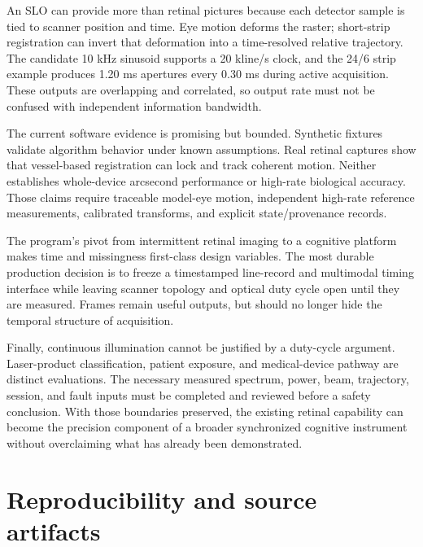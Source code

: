 \documentclass[11pt]{article}
\begin{document}
An SLO can provide more than retinal pictures because each detector sample is tied to scanner
position and time. Eye motion deforms the raster; short-strip registration can invert that
deformation into a time-resolved relative trajectory. The candidate 10 kHz sinusoid supports a
20 kline/s clock, and the 24/6 strip example produces 1.20 ms apertures every 0.30 ms during active
acquisition. These outputs are overlapping and correlated, so output rate must not be confused with
independent information bandwidth.

The current software evidence is promising but bounded. Synthetic fixtures validate algorithm
behavior under known assumptions. Real retinal captures show that vessel-based registration can
lock and track coherent motion. Neither establishes whole-device arcsecond performance or
high-rate biological accuracy. Those claims require traceable model-eye motion, independent
high-rate reference measurements, calibrated transforms, and explicit state/provenance records.

The program's pivot from intermittent retinal imaging to a cognitive platform makes time and
missingness first-class design variables. The most durable production decision is to freeze a
timestamped line-record and multimodal timing interface while leaving scanner topology and optical
duty cycle open until they are measured. Frames remain useful outputs, but should no longer hide
the temporal structure of acquisition.

Finally, continuous illumination cannot be justified by a duty-cycle argument. Laser-product
classification, patient exposure, and medical-device pathway are distinct evaluations. The
necessary measured spectrum, power, beam, trajectory, session, and fault inputs must be completed
and reviewed before a safety conclusion. With those boundaries preserved, the existing retinal
capability can become the precision component of a broader synchronized cognitive instrument
without overclaiming what has already been demonstrated.

\appendix
\section{Reproducibility and source artifacts}
\end{document}
